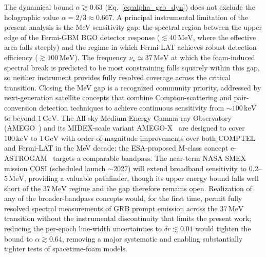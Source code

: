 \documentclass[aps,prd,onecolumn,amsmath,amssymb]{revtex4-2}
\begin{document}
The dynamical bound $\alpha\gtrsim 0.63$
(Eq.~\eqref{eq:alpha_grb_dyn}) does not exclude the holographic value
$\alpha=2/3\approx 0.667$.  A principal instrumental limitation of the
present analysis is the MeV sensitivity gap: the spectral region
between the upper edge of the Fermi-GBM BGO detector response
($\lesssim40\,\mathrm{MeV}$, where the effective area falls steeply)
and the regime in which Fermi-LAT achieves robust detection efficiency
($\gtrsim100\,\mathrm{MeV}$).
The frequency $\nu_\star \simeq 37\,\mathrm{MeV}$ at which the foam-induced
spectral break is predicted to be most constraining falls squarely within
this gap, so neither instrument provides fully resolved coverage across
the critical transition.
Closing the MeV gap is a recognized community priority, addressed by
next-generation satellite concepts that combine Compton-scattering and
pair-conversion detection techniques to achieve continuous sensitivity from
$\sim100\,\mathrm{keV}$ to beyond $1\,\mathrm{GeV}$.
The All-sky Medium Energy Gamma-ray Observatory
(AMEGO~\cite{McEnery2019}) and its MIDEX-scale variant
AMEGO-X~\cite{Caputo2022} are designed to cover $100\,\mathrm{keV}$ to
$1\,\mathrm{GeV}$ with order-of-magnitude improvements over both COMPTEL
and Fermi-LAT in the MeV decade; the ESA-proposed M-class concept
e-ASTROGAM~\cite{DeAngelis2017} targets a comparable bandpass.
The near-term NASA SMEX mission COSI (scheduled launch $\sim$2027)
will extend broadband sensitivity to $0.2$--$5\,\mathrm{MeV}$, providing
a valuable pathfinder, though its upper energy bound falls well short of
the $37\,\mathrm{MeV}$ regime and the gap therefore remains open.
Realization of any of the broader-bandpass concepts would, for the first
time, permit fully resolved spectral measurements of GRB prompt emission
across the $37\,\mathrm{MeV}$ transition without the instrumental
discontinuity that limits the present work; reducing the per-epoch
line-width uncertainties to $\delta r\lesssim 0.01$ would tighten the
bound to $\alpha\gtrsim 0.64$, removing a major systematic and
enabling substantially tighter tests of spacetime-foam models.
\end{document}
